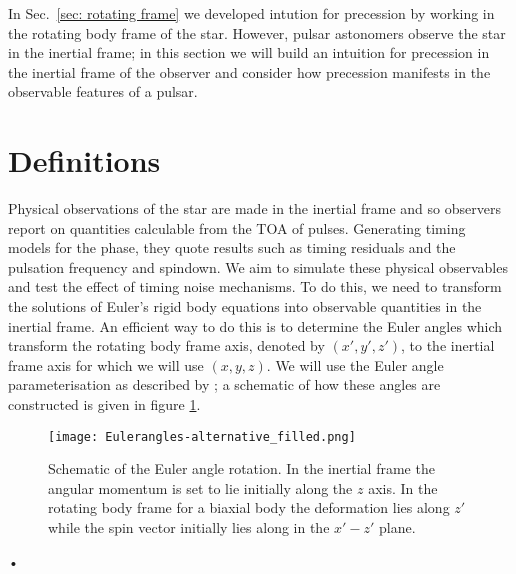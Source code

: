 \documentclass[../full_thesis/full_thesis.tex]{subfiles}
\begin{document}
In Sec.~\ref{sec: rotating frame} we developed intution for precession by working
in the rotating body frame of the star. However, pulsar astonomers observe the
star in the inertial frame; in this section we will build an intuition for precession
in the inertial frame of the observer and consider how precession manifests in
the observable features of a pulsar.

\newcommand{\Jr}{\mathbf{J}_{\textrm{rot}}}
\newcommand{\Ji}{\mathbf{J}_{\textrm{in}}}

\section{Definitions}
Physical observations of the star are made in the inertial frame and
so observers report on quantities calculable from the TOA of pulses. Generating
timing models for the phase, they quote results such as timing residuals and
the pulsation frequency and spindown. We aim to simulate these physical
observables and test the effect of timing noise mechanisms. To do
this, we need to transform the solutions of Euler's rigid body equations into
observable quantities in the inertial frame. An efficient way to do this is to
determine the Euler angles which transform the rotating body frame axis,
denoted by $(x',y', z')$, to the inertial frame axis for which we will use $(x,
y, z)$. We will use the Euler angle parameterisation as described by
\citet{Landau1969}; a schematic of how these angles are constructed is given in
figure \ref{fig: Euler}.
\begin{figure}[ht]
\centering
\texttt{[image: Eulerangles-alternative\_filled.png]}
\caption{Schematic of the Euler angle rotation. In the inertial frame the
angular momentum is set to lie initially along the $z$ axis. In the rotating
body frame for a biaxial body the deformation lies along $z'$ while the spin
vector initially lies along in the $x'- z'$ plane.}
\label{fig: Euler}
\end{figure}•
\end{document}
